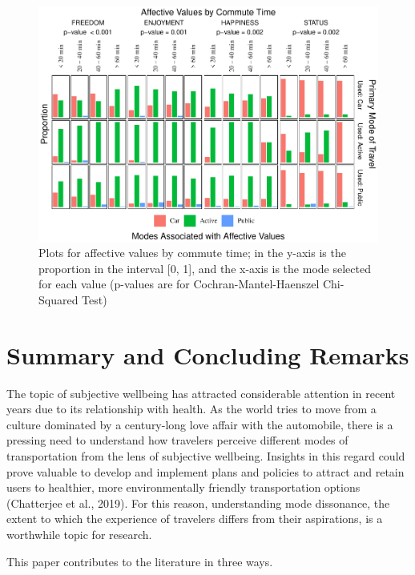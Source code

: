 \documentclass[]{elsarticle} %
\begin{document}
\begin{figure}
\centering
\includegraphics{Dissonance_Santiago_v3_files/figure-latex/figure-bar-plots-by-attribute-and-travel-time-1.pdf}
\caption{\label{fig:bar-plots-by-travel-time}Plots for affective values
by commute time; in the y-axis is the proportion in the interval {[}0,
1{]}, and the x-axis is the mode selected for each value (p-values are
for Cochran-Mantel-Haenszel Chi-Squared Test)}
\end{figure}

\hypertarget{summary-and-concluding-remarks}{%
\section{Summary and Concluding
Remarks}\label{summary-and-concluding-remarks}}

The topic of subjective wellbeing has attracted considerable attention
in recent years due to its relationship with health. As the world tries
to move from a culture dominated by a century-long love affair with the
automobile, there is a pressing need to understand how travelers
perceive different modes of transportation from the lens of subjective
wellbeing. Insights in this regard could prove valuable to develop and
implement plans and policies to attract and retain users to healthier,
more environmentally friendly transportation options (Chatterjee et al.,
2019). For this reason, understanding mode dissonance, the extent to
which the experience of travelers differs from their aspirations, is a
worthwhile topic for research.

This paper contributes to the literature in three ways.
\end{document}
